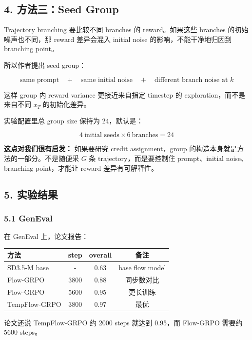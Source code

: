 \subsection{4. 方法三：Seed Group}

Trajectory branching 要比较不同 branches 的 reward。如果这些 branches 的初始噪声也不同，那 reward 差异会混入 initial noise 的影响，不能干净地归因到 branching point。

所以作者提出 seed group：

\[
\text{same prompt}
\quad + \quad
\text{same initial noise}
\quad + \quad
\text{different branch noise at } k
\]

这样 group 内 reward variance 更接近来自指定 timestep 的 exploration，而不是来自不同 \(x_T\) 的初始化差异。

实验配置里总 group size 保持为 24，默认是：

\[
4\ \text{initial seeds}
\times
6\ \text{branches}
=
24
\]

\begin{summarybox}
\textbf{这点对我们很有启发：} 如果要研究 credit assignment，group 的构造本身就是方法的一部分。不是随便采 \(G\) 条 trajectory，而是要控制住 prompt、initial noise、branching point，才能让 reward 差异有可解释性。
\end{summarybox}

\subsection{5. 实验结果}

\subsubsection{5.1 GenEval}

在 GenEval 上，论文报告：

\begin{center}
\begin{tabular}{lccc}
\toprule
方法 & step & overall & 备注 \\
\midrule
SD3.5-M base & - & 0.63 & base flow model \\
Flow-GRPO & 3800 & 0.88 & 同步数对比 \\
Flow-GRPO & 5600 & 0.95 & 更长训练 \\
TempFlow-GRPO & 3800 & 0.97 & 最优 \\
\bottomrule
\end{tabular}
\end{center}

论文还说 TempFlow-GRPO 约 2000 steps 就达到 0.95，而 Flow-GRPO 需要约 5600 steps。

